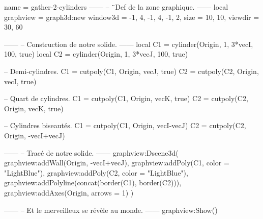 \documentclass{standalone}
\begin{document}
\begin{luadraw}{name = gather-2-cylinders}
------
-- ¨Def de la zone graphique.
------
local graphview = graph3d:new{
  window3d = {-1, 4, -1, 4, -1, 2},
  size     = {10, 10},
  viewdir  = {30, 60}
}

------
-- Construction de notre solide.
------
local C1 = cylinder(Origin, 1, 3*vecI, 100, true)
local C2 = cylinder(Origin, 1, 3*vecJ, 100, true)

-- Demi-cylindres.
C1 = cutpoly(C1, {Origin, vecJ}, true)
C2 = cutpoly(C2, {Origin, vecI}, true)

-- Quart de cylindres.
C1 = cutpoly(C1, {Origin, vecK}, true)
C2 = cutpoly(C2, {Origin, vecK}, true)

-- Cylindres biseautés.
C1 = cutpoly(C1, {Origin, vecI-vecJ})
C2 = cutpoly(C2, {Origin, -vecI+vecJ})

------
-- Tracé de notre solide.
------
graphview:Dscene3d(
  graphview:addWall({Origin, -vecI+vecJ}),
  graphview:addPoly(C1, {color = "LightBlue"}),
  graphview:addPoly(C2, {color = "LightBlue"}),
  graphview:addPolyline(concat(border(C1), border(C2))),
  graphview:addAxes(Origin, {arrows = 1})
)

------
-- Et le merveilleux se révèle au monde.
------
graphview:Show()
\end{luadraw}
\end{document}
